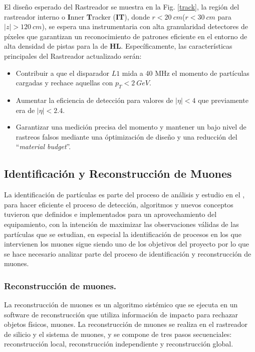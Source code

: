 El diseño esperado del Rastreador se muestra en la Fig. \ref{track}, la región del rastreador interno o \textbf{I}nner \textbf{T}racker (\textbf{IT}), donde $r < 20 ~ cm$($r < 30 ~ cm$ para $|z|> 120 ~ cm$), se espera una instrumentaria con alta granularidad detectores de píxeles que garantizan un reconocimiento de patrones eficiente en el entorno de alta densidad de pistas para la de \textbf{HL}. %
Específicamente, las características principales del Rastreador actualizado serán:
\begin{itemize}
\item Contribuir a que el disparador $L1$ mida a 40 MHz el momento de partículas cargadas y rechace aquellas con $p_T < 2 ~ GeV$.
\item Aumentar la eficiencia de detección para valores de $|\eta| < 4$ que previamente era de $|\eta| < 2.4$. 
\item Garantizar una medición precisa del momento y mantener un bajo nivel de rastreos falsos mediante una óptimización de diseño y una reducción del ``\textit{material budget}''.
\end{itemize}



\subsection{Identificación y Reconstrucción de Muones}

La identificación de partículas es parte del proceso de análisis y estudio en el \LHC, para hacer eficiente el proceso de detección, algoritmos y nuevos conceptos tuvieron que definidos e implementados para un aprovechamiento del equipamiento, con la intención de maximizar las observaciones válidas de las partículas que se estudian, en especial la identificación de procesos en los que intervienen los muones sigue siendo uno de los objetivos del proyecto por lo que se hace necesario analizar parte del proceso de identificación y reconstrucción de muones.

\subsubsection{Reconstrucción de muones.}
La reconstrucción de muones es un algoritmo sistémico que se ejecuta en un software de reconstrucción que utiliza información de impacto para rechazar objetos físicos, muones. La reconstrucción de muones se realiza en el rastreador de silicio y el sistema de muones, y se compone de tres pasos secuenciales: reconstrucción local, reconstrucción independiente y reconstrucción global. 

